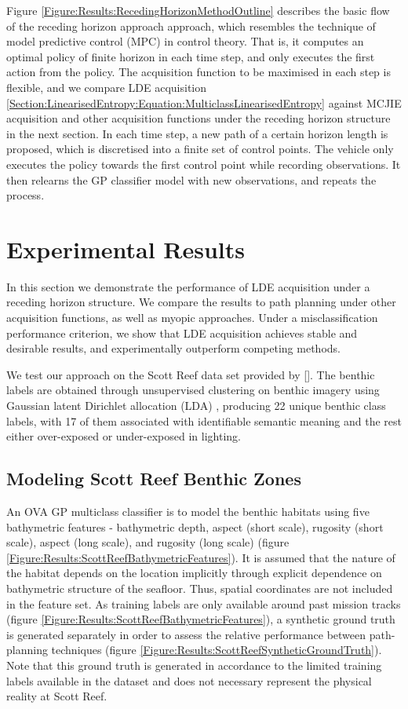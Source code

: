 \documentclass{article}
\newcommand{\incite}[1]{\citeauthor{#1} [\citeyear{#1}]}
\begin{document}
		Figure \ref{Figure:Results:RecedingHorizonMethodOutline} describes the basic flow of the receding horizon approach approach, which resembles the technique of model predictive control (MPC) in control theory. That is, it computes an optimal policy of finite horizon in each time step, and only executes the first action from the policy. The acquisition function to be maximised in each step is flexible, and we compare LDE acquisition \eqref{Section:LinearisedEntropy:Equation:MulticlassLinearisedEntropy} against MCJIE acquisition and other acquisition functions under the receding horizon structure in the next section. In each time step, a new path of a certain horizon length is proposed, which is discretised into a finite set of control points. The vehicle only executes the policy towards the first control point while recording observations. It then relearns the GP classifier model with new observations, and repeats the process. 
		
\section{Experimental Results}
\label{Section:ExperimentalResults}

	In this section we demonstrate the performance of LDE acquisition under a receding horizon structure. We compare the results to path planning under other acquisition functions, as well as myopic approaches. Under a misclassification performance criterion, we show that LDE acquisition achieves stable and desirable results, and experimentally outperform competing methods.
	
	We test our approach on the Scott Reef data set provided by \incite{IMOS}. The benthic labels are obtained through unsupervised clustering on benthic imagery using Gaussian latent Dirichlet allocation (LDA) \cite{Steinberg2015128}, producing 22 unique benthic class labels, with 17 of them associated with identifiable semantic meaning and the rest either over-exposed or under-exposed in lighting. 

	\subsection{Modeling Scott Reef Benthic Zones}
		
		An OVA GP multiclass classifier is to model the benthic habitats using five bathymetric features - bathymetric depth, aspect (short scale), rugosity (short scale), aspect (long scale), and rugosity (long scale) (figure \ref{Figure:Results:ScottReefBathymetricFeatures}). It is assumed that the nature of the habitat depends on the location implicitly through explicit dependence on bathymetric structure of the seafloor. Thus, spatial coordinates are not included in the feature set. As training labels are only available around past mission tracks (figure \ref{Figure:Results:ScottReefBathymetricFeatures}), a synthetic ground truth is generated separately in order to assess the relative performance between path-planning techniques (figure \ref{Figure:Results:ScottReefSyntheticGroundTruth}). Note that this ground truth is generated in accordance to the limited training labels available in the dataset and does not necessary represent the physical reality at Scott Reef. 
\end{document}
